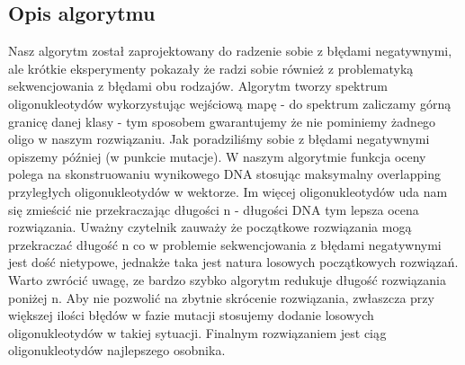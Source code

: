 \documentclass{article}
\begin{document}
\subsection{Opis algorytmu}
Nasz algorytm został zaprojektowany do radzenie sobie z błędami negatywnymi, ale krótkie eksperymenty pokazały że radzi sobie również z problematyką sekwencjowania z błędami obu rodzajów.
Algorytm tworzy spektrum oligonukleotydów wykorzystując wejściową mapę -  do spektrum zaliczamy górną granicę danej klasy - tym sposobem gwarantujemy że nie pominiemy żadnego oligo w naszym rozwiązaniu. Jak poradziliśmy sobie z błędami negatywnymi opiszemy później (w punkcie mutacje). 
W naszym algorytmie funkcja oceny polega na skonstruowaniu wynikowego DNA stosując maksymalny overlapping przyległych oligonukleotydów w wektorze. Im więcej oligonukleotydów uda nam się zmieścić nie przekraczając długości n - długości DNA tym lepsza ocena rozwiązania. Uważny czytelnik zauważy że początkowe rozwiązania mogą przekraczać długość n co w problemie sekwencjowania z błędami negatywnymi jest dość nietypowe, jednakże taka jest natura losowych początkowych rozwiązań. Warto zwrócić uwagę, ze bardzo szybko algorytm redukuje długość rozwiązania poniżej n. Aby nie pozwolić na zbytnie skrócenie rozwiązania, zwłaszcza przy większej ilości błędów w fazie mutacji stosujemy dodanie losowych oligonukleotydów w takiej sytuacji. Finalnym rozwiązaniem jest ciąg oligonukleotydów najlepszego osobnika.
\end{document}
